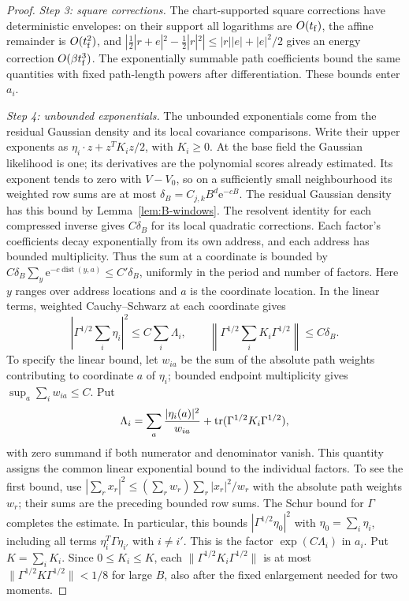\begin{proof}
\emph{Step 3: square corrections.} The chart-supported square corrections have deterministic envelopes: on their support all logarithms are $O(t_{\rm f})$, the affine remainder is $O(t_{\rm f}^2)$, and $|\tfrac12|r+e|^2-\tfrac12|r|^2|\le |r||e|+|e|^2/2$ gives an energy correction $O(\beta t_{\rm f}^3)$. The exponentially summable path coefficients bound the same quantities with fixed path-length powers after differentiation. These bounds enter $a_i$.

\emph{Step 4: unbounded exponentials.} The unbounded exponentials come from the residual Gaussian density and its local covariance comparisons. Write their upper exponents as $\eta_i\cdot z+z^TK_i z/2$, with $K_i\ge0$. At the base field the Gaussian likelihood is one; its derivatives are the polynomial scores already estimated. Its exponent tends to zero with $V-V_0$, so on a sufficiently small neighbourhood its weighted row sums are at most $\delta_B=C_{j,k}B^d \mathrm e^{-cB}$. The residual Gaussian density has this bound by Lemma~\ref{lem:B-windows}. The resolvent identity for each compressed inverse gives $C\delta_B$ for its local quadratic corrections. Each factor's coefficients decay exponentially from its own address, and each address has bounded multiplicity. Thus the sum at a coordinate is bounded by $C\delta_B\sum_y\mathrm e^{-c\operatorname{dist}(y,a)}\le C'\delta_B$, uniformly in the period and number of factors. Here $y$ ranges over address locations and $a$ is the coordinate location. In the linear terms, weighted Cauchy--Schwarz at each coordinate gives
\begin{equation*}
\left|\Gamma^{1/2}\sum_i\eta_i\right|^2
 \le C\sum_i\Lambda_i,\qquad
\left\|\Gamma^{1/2}\sum_iK_i\Gamma^{1/2}\right\|\le C\delta_B.
\end{equation*}
To specify the linear bound, let $w_{ia}$ be the sum of the absolute path weights contributing to coordinate $a$ of $\eta_i$; bounded endpoint multiplicity gives $\sup_a\sum_i w_{ia}\le C$. Put
\begin{equation*}
\Lambda_i=\sum_a\frac{|\eta_i(a)|^2}{w_{ia}}+\operatorname{tr}(\Gamma^{1/2}K_i\Gamma^{1/2}),
\end{equation*}
with zero summand if both numerator and denominator vanish. This quantity assigns the common linear exponential bound to the individual factors. To see the first bound, use $|\sum_r x_r|^2\le(\sum_r w_r)\sum_r|x_r|^2/w_r$ with the absolute path weights $w_r$; their sums are the preceding bounded row sums. The Schur bound for $\Gamma$ completes the estimate. In particular, this bounds $|\Gamma^{1/2}\eta_0|^2$ with $\eta_0=\sum_i\eta_i$, including all terms $\eta_i^T\Gamma\eta_{i'}$ with $i\ne i'$. This is the factor $\exp(C\Lambda_i)$ in $a_i$. Put $K=\sum_iK_i$. Since $0\le K_i\le K$, each $\|\Gamma^{1/2}K_i\Gamma^{1/2}\|$ is at most $\|\Gamma^{1/2}K\Gamma^{1/2}\|<1/8$ for large $B$, also after the fixed enlargement needed for two moments.

\end{proof}
